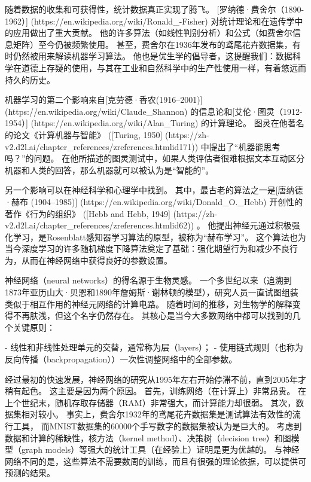 随着数据的收集和可获得性，统计数据真正实现了腾飞。 [罗纳德·费舍尔（1890-1962）]
(https://en.wikipedia.org/wiki/Ronald\_-Fisher)
对统计理论和在遗传学中的应用做出了重大贡献。 他的许多算法（如线性判别分析）和公式（如费舍尔信息矩阵）至今仍被频繁使用。 甚至，费舍尔在1936年发布的鸢尾花卉数据集，有时仍然被用来解读机器学习算法。 他也是优生学的倡导者，这提醒我们：数据科学在道德上存疑的使用，与其在工业和自然科学中的生产性使用一样，有着悠远而持久的历史。

机器学习的第二个影响来自[克劳德·香农(1916–2001)]
(https://en.wikipedia.org/wiki/Claude\_Shannon)
的信息论和[艾伦·图灵（1912-1954）]
(https://en.wikipedia.org/wiki/Alan\_Turing)
的计算理论。 图灵在他著名的论文《计算机器与智能》 ([Turing, 1950]
(https://zh-v2.d2l.ai/chapter\_references/zreferences.htmlid171)) 
中提出了“机器能思考吗？”的问题。 在他所描述的图灵测试中，如果人类评估者很难根据文本互动区分机器和人类的回答，那么机器就可以被认为是“智能的”。

另一个影响可以在神经科学和心理学中找到。 其中，最古老的算法之一是[唐纳德·赫布 (1904–1985)]
(https://en.wikipedia.org/wiki/Donald\_O.\_Hebb)
开创性的著作《行为的组织》 ([Hebb and Hebb, 1949]
(https://zh-v2.d2l.ai/chapter\_references/zreferences.htmlid62)) 。
他提出神经元通过积极强化学习，是Rosenblatt感知器学习算法的原型，被称为“赫布学习”。 这个算法也为当今深度学习的许多随机梯度下降算法奠定了基础：强化期望行为和减少不良行为，从而在神经网络中获得良好的参数设置。

神经网络（neural networks）的得名源于生物灵感。 一个多世纪以来（追溯到1873年亚历山大·贝恩和1890年詹姆斯·谢林顿的模型），研究人员一直试图组装类似于相互作用的神经元网络的计算电路。 随着时间的推移，对生物学的解释变得不再肤浅，但这个名字仍然存在。 其核心是当今大多数网络中都可以找到的几个关键原则：

- 线性和非线性处理单元的交替，通常称为层（layers）；
- 使用链式规则（也称为反向传播（backpropagation））一次性调整网络中的全部参数。

经过最初的快速发展，神经网络的研究从1995年左右开始停滞不前，直到2005年才稍有起色。 这主要是因为两个原因。 首先，训练网络（在计算上）非常昂贵。 在上个世纪末，随机存取存储器（RAM）非常强大，而计算能力却很弱。 其次，数据集相对较小。 事实上，费舍尔1932年的鸢尾花卉数据集是测试算法有效性的流行工具， 而MNIST数据集的60000个手写数字的数据集被认为是巨大的。 考虑到数据和计算的稀缺性，核方法（kernel method）、决策树（decision tree）和图模型（graph models）等强大的统计工具（在经验上）证明是更为优越的。 与神经网络不同的是，这些算法不需要数周的训练，而且有很强的理论依据，可以提供可预测的结果。

